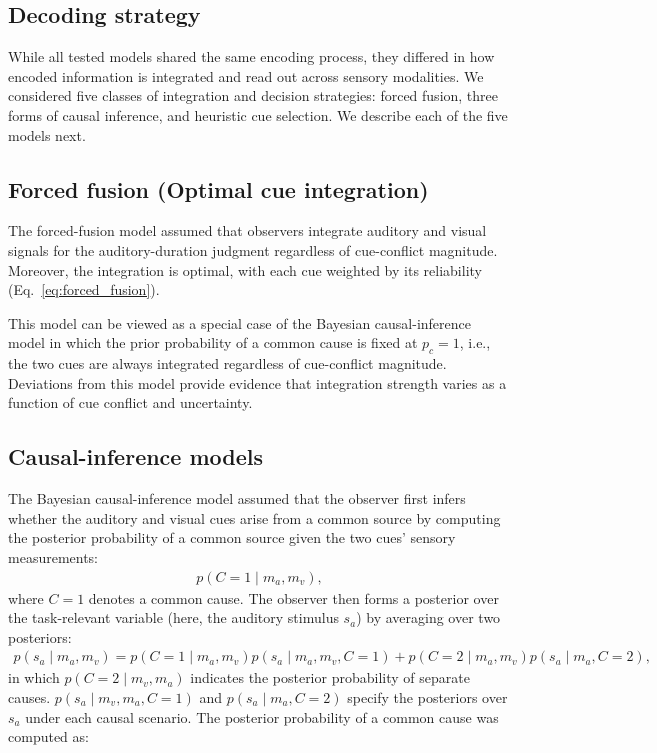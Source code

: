 \documentclass[9pt,lineno,doublespacing]{elife}
\begin{document}
\subsection{Decoding strategy}
While all tested models shared the same encoding process, they differed in how encoded information is integrated and read out across sensory modalities. We considered five classes of integration and decision strategies: forced fusion, three forms of causal inference, and heuristic cue selection. We describe each of the five models next.  

% 

\subsection{Forced fusion (Optimal cue integration)}
The forced-fusion model assumed that observers integrate auditory and visual signals for the auditory-duration judgment regardless of cue-conflict magnitude. Moreover, the integration is optimal, with each cue weighted by its reliability (Eq.~\ref{eq:forced_fusion}). 

This model can be viewed as a special case of the Bayesian causal-inference model in which the prior probability of a common cause is fixed at $p_c=1$, i.e., the two cues are always integrated regardless of cue-conflict magnitude. Deviations from this model provide evidence that integration strength varies as a function of cue conflict and uncertainty.

\subsection{Causal-inference models}
The Bayesian causal-inference model assumed that the observer first infers whether the auditory and visual cues arise from a common source by computing the posterior probability of a common source given the two cues' sensory measurements:
\begin{align}
p(C = 1 \mid m_a, m_v),
\label{eq:pc}
\end{align}
where $C = 1$ denotes a common cause. The observer then forms a posterior over the task-relevant variable (here, the auditory stimulus $s_a$) by averaging over two posteriors:
\begin{align}
p(s_a \mid m_a, m_v) = p(C = 1 \mid m_a, m_v) p(s_a \mid m_a, m_v,C=1) +  p(C = 2 \mid m_a, m_v) p(s_a \mid m_a,C=2),
\label{eq:auditory_bimodal_estimate}
\end{align}
in which $p(C = 2 \mid m_v, m_a)$ indicates the posterior probability of separate causes. $p(s_a \mid m_v, m_a, C=1)$ and $p(s_a \mid m_a,C=2)$ specify the posteriors over $s_a$ under each causal scenario. The posterior probability of a common cause was computed as:
\end{document}
